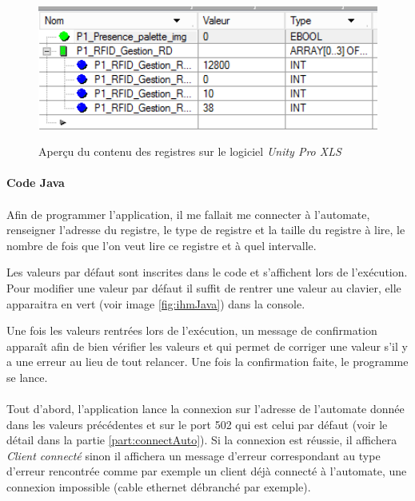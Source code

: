         \begin{figure}[H]
            \centering
            \begin{frame}{\includegraphics[width=1\textwidth]{image/regUnity.png}}
            \end{frame}
            \caption{\label{fig:regUnity}Aperçu du contenu des registres sur le logiciel \textit{Unity Pro XLS}}
        \end{figure}
        
        \paragraph{Code Java}
        \label{part:progJava}
            \paragraph*{}
            Afin de programmer l'application, il me fallait me connecter à l'automate, renseigner l'adresse du registre, le type de registre et la taille du registre à lire, le nombre de fois que l'on veut lire ce registre et à quel intervalle.
            
            Les valeurs par défaut sont inscrites dans le code et s'affichent lors de l'exécution. Pour modifier une valeur par défaut il suffit de rentrer une valeur au clavier, elle apparaitra en vert (voir image \ref{fig:ihmJava}) dans la console.
            
            Une fois les valeurs rentrées lors de l'exécution, un message de confirmation apparaît afin de bien vérifier les valeurs et qui permet de corriger une valeur s'il y a une erreur au lieu de tout relancer. Une fois la confirmation faite, le programme se lance.
            
            \paragraph*{}
            Tout d'abord, l'application lance la connexion sur l'adresse de l'automate donnée dans les valeurs précédentes et sur le port 502 qui est celui par défaut (voir le détail dans la partie \ref{part:connectAuto}). Si la connexion est réussie, il affichera \textit{Client connecté} sinon il affichera un message d'erreur correspondant au type d'erreur rencontrée comme par exemple un client déjà connecté à l'automate, une connexion impossible (cable ethernet débranché par exemple).
            
